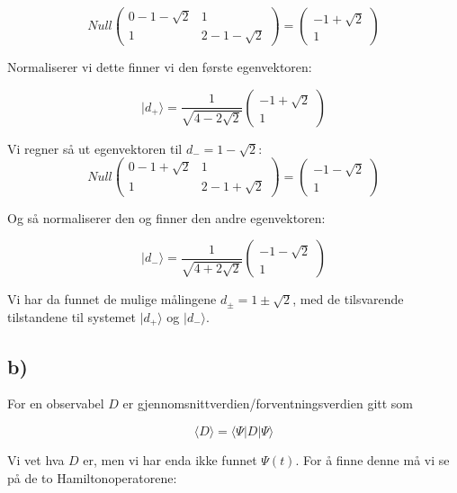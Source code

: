 \documentclass[a4paper,norsk, 10pt]{article}
\numberwithin{equation}{section}
\begin{document}
$$
Null
\begin{pmatrix}
0 -1 - \sqrt{2} & 1\\
1 & 2 -1 - \sqrt{2}
\end{pmatrix}
= 
\begin{pmatrix}
-1 + \sqrt{2}\\
1
\end{pmatrix}
$$

Normaliserer vi dette finner vi den første egenvektoren:

\begin{equation}
|d_+\rangle = \frac{1}{\sqrt{4-2\sqrt{2}}}
\begin{pmatrix}
-1 + \sqrt{2}\\
1
\end{pmatrix}
\label{eq:d+}
\end{equation}


Vi regner så ut egenvektoren til $d_- = 1-\sqrt{2}$:
$$
Null
\begin{pmatrix}
0 -1 + \sqrt{2} & 1\\
1 & 2 -1 + \sqrt{2}
\end{pmatrix}
= 
\begin{pmatrix}
-1 - \sqrt{2}\\
1
\end{pmatrix}
$$

Og så normaliserer den og finner den andre egenvektoren:

\begin{equation}
|d_-\rangle = \frac{1}{\sqrt{4+2\sqrt{2}}}
\begin{pmatrix}
-1 - \sqrt{2}\\
1
\end{pmatrix}
\label{eq:d-}
\end{equation}

Vi har da funnet de mulige målingene $d_{\pm} = 1 \pm \sqrt{2}$, med de tilsvarende tilstandene til systemet $|d_+\rangle$ og $|d_-\rangle$.

\subsection*{b)}

For en observabel $D$ er gjennomsnittverdien/forventningsverdien gitt som

$$
\langle D\rangle = \langle\Psi | D | \Psi \rangle
$$

Vi vet hva $D$ er, men vi har enda ikke funnet $\Psi(t)$. For å finne denne må vi se på de to Hamiltonoperatorene:
\end{document}
